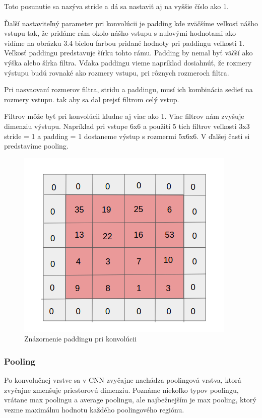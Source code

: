 Toto posunutie sa nazýva stride a dá sa nastaviť aj na vyššie číslo ako 1.

Ďalší nastaviteľný parameter pri konvolúcii je padding kde zväčšíme veľkosť nášho vstupu tak, že pridáme rám okolo nášho vstupu s nulovými hodnotami ako vidíme na obrázku 3.4 bielou farbou pridané hodnoty pri paddingu veľkosti 1. Veľkosť paddingu predstavuje šírku tohto rámu. Padding by nemal byť väčší ako výška alebo šírka filtra. Vďaka paddingu vieme napríklad dosiahnúť, že rozmery výstupu budú rovnaké ako rozmery vstupu, pri rôznych rozmeroch filtra.

Pri nasvaovaní rozmerov filtra, stridu a paddingu, musí ich kombinácia sedieť na rozmery vstupu. tak aby sa dal prejsť filtrom celý vstup.

Filtrov môže byť pri konvolúcii kludne aj viac ako 1. Viac filtrov nám zvyšuje dimenziu výstupu. Napríklad pri vstupe 6x6 a použití 5 tich filtrov veľkosti 3x3 stride = 1 a padding = 1 dostaneme výstup s rozmermi 5x6x6. V ďalšej časti si predstavíme pooling.

\begin{figure}[!hbt]
\includegraphics[width=\textwidth]{images/padding.png}
\centering
\caption{Znázornenie paddingu pri konvolúcii}
\label{fig:image}
\end{figure}

\subsubsection{Pooling}
\hspace{\parindent} Po konvolučnej vrstve sa v CNN zvyčajne nachádza poolingová vrstva, ktorá zvyčajne zmenšuje priestorovú dimenziu. Poznáme niekoľko typov poolingu, vrátane max poolingu a average poolingu, ale najbežnejším je max pooling, ktorý vezme maximálnu hodnotu každého poolingového regiónu. 

